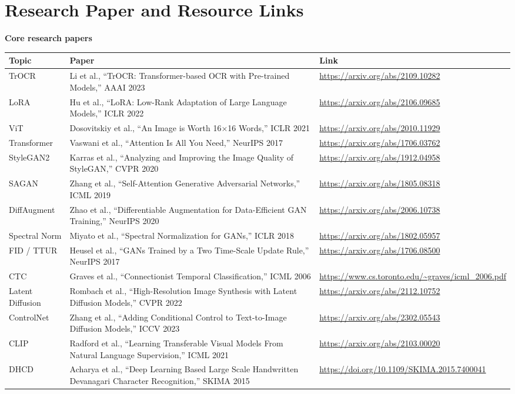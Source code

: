\documentclass[12pt,a4paper]{report}
\begin{document}
\section{Research Paper and Resource Links}

\textbf{Core research papers}

\begin{longtable}{p{2.4cm}p{7.2cm}p{4.4cm}}
\toprule
\textbf{Topic} & \textbf{Paper} & \textbf{Link} \\
\midrule
TrOCR & Li et al., ``TrOCR: Transformer-based OCR with Pre-trained Models,'' AAAI 2023 & \url{https://arxiv.org/abs/2109.10282} \\
LoRA & Hu et al., ``LoRA: Low-Rank Adaptation of Large Language Models,'' ICLR 2022 & \url{https://arxiv.org/abs/2106.09685} \\
ViT & Dosovitskiy et al., ``An Image is Worth 16$\times$16 Words,'' ICLR 2021 & \url{https://arxiv.org/abs/2010.11929} \\
Transformer & Vaswani et al., ``Attention Is All You Need,'' NeurIPS 2017 & \url{https://arxiv.org/abs/1706.03762} \\
StyleGAN2 & Karras et al., ``Analyzing and Improving the Image Quality of StyleGAN,'' CVPR 2020 & \url{https://arxiv.org/abs/1912.04958} \\
SAGAN & Zhang et al., ``Self-Attention Generative Adversarial Networks,'' ICML 2019 & \url{https://arxiv.org/abs/1805.08318} \\
DiffAugment & Zhao et al., ``Differentiable Augmentation for Data-Efficient GAN Training,'' NeurIPS 2020 & \url{https://arxiv.org/abs/2006.10738} \\
Spectral Norm & Miyato et al., ``Spectral Normalization for GANs,'' ICLR 2018 & \url{https://arxiv.org/abs/1802.05957} \\
FID / TTUR & Heusel et al., ``GANs Trained by a Two Time-Scale Update Rule,'' NeurIPS 2017 & \url{https://arxiv.org/abs/1706.08500} \\
CTC & Graves et al., ``Connectionist Temporal Classification,'' ICML 2006 & \url{https://www.cs.toronto.edu/~graves/icml_2006.pdf} \\
Latent Diffusion & Rombach et al., ``High-Resolution Image Synthesis with Latent Diffusion Models,'' CVPR 2022 & \url{https://arxiv.org/abs/2112.10752} \\
ControlNet & Zhang et al., ``Adding Conditional Control to Text-to-Image Diffusion Models,'' ICCV 2023 & \url{https://arxiv.org/abs/2302.05543} \\
CLIP & Radford et al., ``Learning Transferable Visual Models From Natural Language Supervision,'' ICML 2021 & \url{https://arxiv.org/abs/2103.00020} \\
DHCD & Acharya et al., ``Deep Learning Based Large Scale Handwritten Devanagari Character Recognition,'' SKIMA 2015 & \url{https://doi.org/10.1109/SKIMA.2015.7400041} \\
\bottomrule
\end{longtable}
\end{document}
